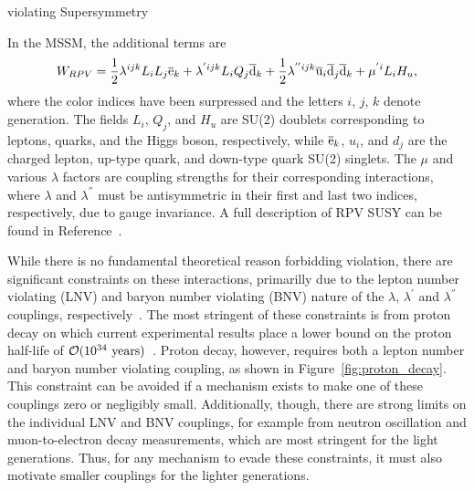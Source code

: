 \begin{section}{\RP violating Supersymmetry}

In the MSSM, the additional \RPV terms are
\begin{align}
W_{RPV} = \frac{1}{2}\lambda^{ijk}L_{i}L_{j}\overline{\mathrm{e}}_{k} + \lambda^{'ijk}L_{i}Q_{j}\overline{\mathrm{d}}_{k} + \frac{1}{2}\lambda^{''ijk}\overline{\mathrm{u}}_{i}\overline{\mathrm{d}}_{j}\overline{\mathrm{d}}_{k} + \mu^{'i}L_{i}H_{u},
\end{align}
where the color indices have been surpressed and the letters $i$, $j$, $k$ denote generation.
The fields $L_{i}$, $Q_{j}$, and $H_u$ are SU(2) doublets corresponding to leptons, quarks, and the Higgs boson, respectively, while $\overline{\mathrm{e}}_k$, $u_i$, and $d_j$ are the charged lepton, up-type quark, and down-type quark SU(2) singlets.
The $\mu$ and various $\lambda$ factors are coupling strengths for their corresponding interactions, where $\lambda$ and $\lambda^{''}$ must be antisymmetric in their first and last two indices, respectively, due to gauge invariance.
A full description of RPV SUSY can be found in Reference~\cite{Barbier:2004ez}.

While there is no fundamental theoretical reason forbidding \RP violation, there are significant constraints on these interactions, primarilly due to the lepton number violating (LNV) and baryon number violating (BNV) nature of the $\lambda$, $\lambda^{'}$ and $\lambda^{''}$ couplings, respectively~\cite{Allanach:1999ic}.
The most stringent of these constraints is from proton decay on which current experimental results place a lower bound on the proton half-life of $\mathcal{O}(10^{34}\ \mathrm{years})$~\cite{Bajc:2016qcc,Nishino:2009aa}.
Proton decay, however, requires both a lepton number and baryon number violating coupling, as shown in Figure~\ref{fig:proton_decay}.
This constraint can be avoided if a mechanism exists to make one of these couplings zero or negligibly small.
Additionally, though, there are strong limits on the individual LNV and BNV couplings, for example from neutron oscillation and muon-to-electron decay measurements, which are most stringent for the light generations.
Thus, for any mechanism to evade these constraints, it must also motivate smaller couplings for the lighter generations.


\end{section}
